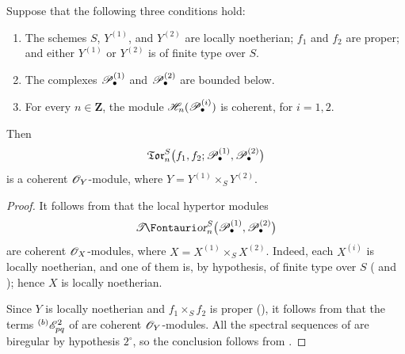 \begin{proposition}[6.7.9]
\label{III.6.7.9}
Suppose that the following three conditions hold:
\begin{enumerate}
  \item[{$1^\circ$}]
    The schemes $S$, $Y^{(1)}$, and $Y^{(2)}$ are locally
    noetherian; $f_1$ and $f_2$ are proper; and either
    $Y^{(1)}$ or $Y^{(2)}$ is of finite type over $S$.
  \item[{$2^\circ$}]
    The complexes $\mathscr{P}_\bullet^{(1)}$ and
    $\mathscr{P}_\bullet^{(2)}$ are bounded below.
  \item[{$3^\circ$}]
    For every $n\in\mathbf Z$, the module
    $\mathscr{H}_n(\mathscr{P}_\bullet^{(i)})$ is coherent, for $i=1,2$.
\end{enumerate}
Then
\[
  \mathfrak{Tor}_n^S
  \bigl(
    f_1,f_2;
    \mathscr{P}_\bullet^{(1)},\mathscr{P}_\bullet^{(2)}
  \bigr)
\]
is a coherent $\mathscr{O}_Y$-module, where
$Y=Y^{(1)}\times_SY^{(2)}$.
\end{proposition}

\begin{proof}
It follows from  that the local hypertor modules
\[
  \shTor_n^S
  \bigl(
    \sh P_\bullet^{(1)},\sh P_\bullet^{(2)}
  \bigr)
\]
are coherent $\mathscr{O}_X$-modules, where
$X=X^{(1)}\times_SX^{(2)}$.  Indeed, each $X^{(i)}$ is locally
noetherian, and one of them is, by hypothesis, of finite type over
    $S$ ( and ); hence $X$ is
locally noetherian.

Since $Y$ is locally noetherian and
$f_1\times_Sf_2$ is proper (), it follows from
 that the terms ${}^{(b)}\mathscr{E}_{pq}^2$ of
 are coherent $\mathscr{O}_Y$-modules.  All the spectral
sequences of  are biregular by hypothesis
$2^\circ$, so the conclusion follows from
.
\end{proof}

